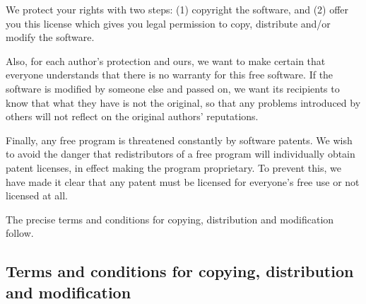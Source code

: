 We protect your rights with two steps: (1) copyright the software, and (2)
offer you this license which gives you legal permission to copy, distribute
and/or modify the software.

Also, for each author's protection and ours, we want to make certain that
everyone understands that there is no warranty for this free software.  If
the software is modified by someone else and passed on, we want its
recipients to know that what they have is not the original, so that any
problems introduced by others will not reflect on the original authors'
reputations.

Finally, any free program is threatened constantly by software patents.  We
wish to avoid the danger that redistributors of a free program will
individually obtain patent licenses, in effect making the program
proprietary.  To prevent this, we have made it clear that any patent must be
licensed for everyone's free use or not licensed at all.

The precise terms and conditions for copying, distribution and modification
follow.


\subsection*{Terms and conditions for copying, distribution and modification}


